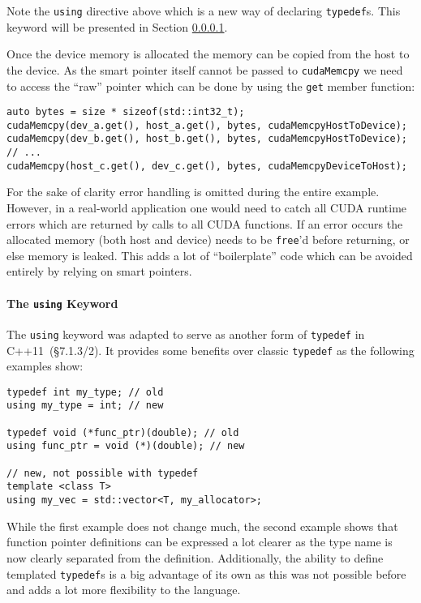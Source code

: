 Note the \texttt{using} directive above which is a new way of declaring \texttt{typedef}s. This keyword will be presented in Section \ref{vec_add:using}.

Once the device memory is allocated the memory can be copied from the host to the device. As the smart pointer itself cannot be passed to \texttt{cudaMemcpy} we need to access the ``raw'' pointer which can be done by using the \texttt{get} member function:

\begin{lstlisting}
auto bytes = size * sizeof(std::int32_t);
cudaMemcpy(dev_a.get(), host_a.get(), bytes, cudaMemcpyHostToDevice);
cudaMemcpy(dev_b.get(), host_b.get(), bytes, cudaMemcpyHostToDevice);
// ...
cudaMemcpy(host_c.get(), dev_c.get(), bytes, cudaMemcpyDeviceToHost);
\end{lstlisting}

For the sake of clarity error handling is omitted during the entire example. However, in a real-world application one would need to catch all CUDA runtime errors which are returned by calls to all CUDA functions. If an error occurs the allocated memory (both host and device) needs to be \texttt{free}'d before returning, or else memory is leaked. This adds a lot of ``boilerplate'' code which can be avoided entirely by relying on smart pointers.

\paragraph{The \texttt{using} Keyword}\label{vec_add:using}

The \texttt{using} keyword was adapted to serve as another form of \texttt{typedef} in C++11~\cite{cpp11std}(§7.1.3/2). It provides some benefits over classic \texttt{typedef} as the following examples show:

\begin{lstlisting}
typedef int my_type; // old
using my_type = int; // new

typedef void (*func_ptr)(double); // old
using func_ptr = void (*)(double); // new

// new, not possible with typedef
template <class T>
using my_vec = std::vector<T, my_allocator>;
\end{lstlisting}

While the first example does not change much, the second example shows that function pointer definitions can be expressed a lot clearer as the type name is now clearly separated from the definition. Additionally, the ability to define templated \texttt{typedef}s is a big advantage of its own as this was not possible before and adds a lot more flexibility to the language.

